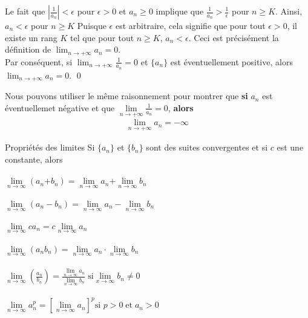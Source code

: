 \documentclass[16pt]{report}
\begin{document}
\begin{multicols*}{2}
\begin{Preuve}{}{}
    Le fait que $\left|\frac{1}{a_n}\right| < \epsilon$ pour $\epsilon > 0$
    et $a_n \geq 0$ implique que $\frac{1}{a_n} > \frac{1}{\epsilon}$ 
    pour $n \geq K$. Ainsi, $a_n < \epsilon$ pour $n \geq K$
    Puisque $\epsilon$ est arbitraire, 
    cela signifie que pour tout $\epsilon > 0$, il existe un rang $K$ 
    tel que pour tout $n \geq K$, $a_n < \epsilon$. 
    Ceci est précisément la définition de $\lim_{n \to +\infty} a_n = 0$.
    \vspace{1em}\\
    Par conséquent, si $\lim_{n \to +\infty} \frac{1}{a_n} = 0$ et 
    $\{ a_n \}$ est éventuellement positive, alors 
    $\lim_{n \to +\infty} a_n = 0$. \qed
    \end{Preuve}

    \begin{note}{}{}
        Nous pouvons utiliser le même raisonnement pour montrer que 
        \textbf{si} $a_n$ est éventuellemet négative et que 
        $\lim\limits_{n\to+\infty}\frac{1}{a_n}  = 0$, \textbf{alors}  
        \begin{align*}
            \lim\limits_{n\to+\infty}a_n  = -\infty 
        \end{align*}
    \end{note}


    \begin{Concept}{Propriétés des limites}{}
        Si $\{a_n\}$ et $\{b_n\}$ sont des suites convergentes et 
        si $c$ est une constante, alors \\\\ 
        $\lim\limits_{n\to\infty  }\left(a_n \text{+} b_n \right) = 
        \lim\limits_{n\to\infty  }a_n \text{+} 
        \lim\limits_{n\to\infty  }b_n$
        \\\\
        $\lim\limits_{n\to\infty  }\left(a_n - b_n \right) = 
        \lim\limits_{n\to\infty  }a_n - \lim\limits_{n\to\infty  }b_n$ 
        \\\\
        $\lim\limits_{n\to\infty  }ca_n = c \lim\limits_{n \to \infty  }a_n$ 
        \\\\
        $\lim\limits_{n\to\infty  }\left(a_nb_n \right) = 
        \lim\limits_{n\to\infty  }a_n \cdot \lim\limits_{n\to\infty  }b_n$
        \\\\
        $\lim\limits_{n\to\infty  }\left(\frac{a_n}{b_n} \right) = 
        \frac{\lim\limits_{n\to\infty  }a_n}{\lim\limits_{n\to\infty  }b_n}
        \;
        \text{si} \lim\limits_{x\to\infty  }b_n \neq 0$
        \\\\
        $\lim\limits_{n\to\infty  }a_n^{p} = 
        \left[\lim\limits_{n\to\infty  }a_n \right]^p \text{si } 
        p > 0 \; \text{et} \; a_n > 0$
    \end{Concept}



\end{multicols*}
\end{document}
